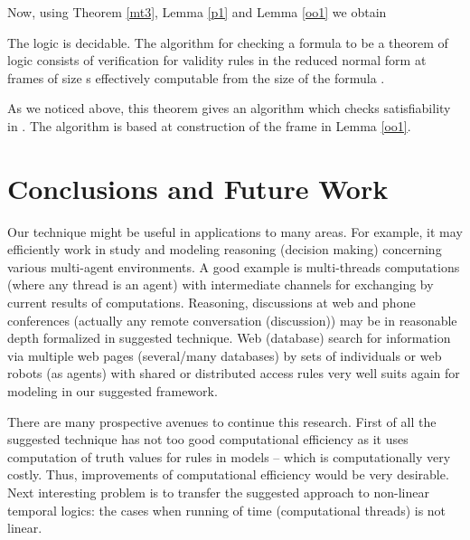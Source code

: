 \documentclass[runningheads]{llncs}
\begin{document}
Now, using
 Theorem \ref{mt3}, Lemma \ref{p1} and Lemma \ref{oo1} we obtain


\begin{theorem}
\label{bn1} The logic  is decidable. The algorithm for
checking a formula  to be a theorem of logic  consists
of verification for validity rules in the reduced normal form at
frames  of size s effectively computable from the size of the
formula .
\end{theorem}

As we noticed above, this theorem  gives an algorithm which checks satisfiability in .
The algorithm is based at construction of the frame  in Lemma \ref{oo1}. 


\section{Conclusions and Future Work}


Our
 technique might be useful in applications to many areas.
For example, it may efficiently work in study and modeling
 reasoning (decision making) concerning various multi-agent environments.
A good example is
 multi-threads  computations (where any thread is an agent) with intermediate channels for exchanging by current results of computations.
Reasoning, discussions at web and phone conferences (actually any remote conversation (discussion)) may be
in reasonable depth formalized in suggested technique.
Web (database) search for information via multiple web pages (several/many databases) by
 sets of
individuals or web robots (as agents) with shared or distributed access rules
 very well suits again for modeling in our suggested framework.



There are many prospective avenues to continue this research.
First of all the suggested technique has not too good computational efficiency as it uses
computation of truth values for rules in models -- which is computationally very costly.
Thus,  improvements of computational efficiency would be very desirable.
Next interesting problem is to transfer the suggested approach to non-linear temporal logics: the cases when running of time (computational threads)
is not linear.




\end{document}
